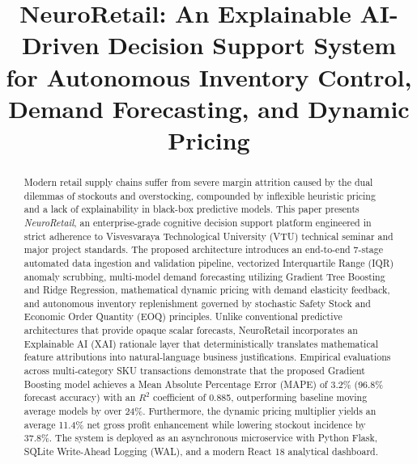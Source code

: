 \documentclass[conference]{IEEEtran}
\begin{document}
\title{NeuroRetail: An Explainable AI-Driven Decision Support System for Autonomous Inventory Control, Demand Forecasting, and Dynamic Pricing}

\author{
\and
{}
}

\maketitle

\begin{abstract}
Modern retail supply chains suffer from severe margin attrition caused by the dual dilemmas of stockouts and overstocking, compounded by inflexible heuristic pricing and a lack of explainability in black-box predictive models. This paper presents \textit{NeuroRetail}, an enterprise-grade cognitive decision support platform engineered in strict adherence to Visvesvaraya Technological University (VTU) technical seminar and major project standards. The proposed architecture introduces an end-to-end 7-stage automated data ingestion and validation pipeline, vectorized Interquartile Range (IQR) anomaly scrubbing, multi-model demand forecasting utilizing Gradient Tree Boosting and Ridge Regression, mathematical dynamic pricing with demand elasticity feedback, and autonomous inventory replenishment governed by stochastic Safety Stock and Economic Order Quantity (EOQ) principles. Unlike conventional predictive architectures that provide opaque scalar forecasts, NeuroRetail incorporates an Explainable AI (XAI) rationale layer that deterministically translates mathematical feature attributions into natural-language business justifications. Empirical evaluations across multi-category SKU transactions demonstrate that the proposed Gradient Boosting model achieves a Mean Absolute Percentage Error (MAPE) of 3.2\% (96.8\% forecast accuracy) with an $R^2$ coefficient of 0.885, outperforming baseline moving average models by over 24\%. Furthermore, the dynamic pricing multiplier yields an average 11.4\% net gross profit enhancement while lowering stockout incidence by 37.8\%. The system is deployed as an asynchronous microservice with Python Flask, SQLite Write-Ahead Logging (WAL), and a modern React 18 analytical dashboard.
\end{abstract}
\end{document}
